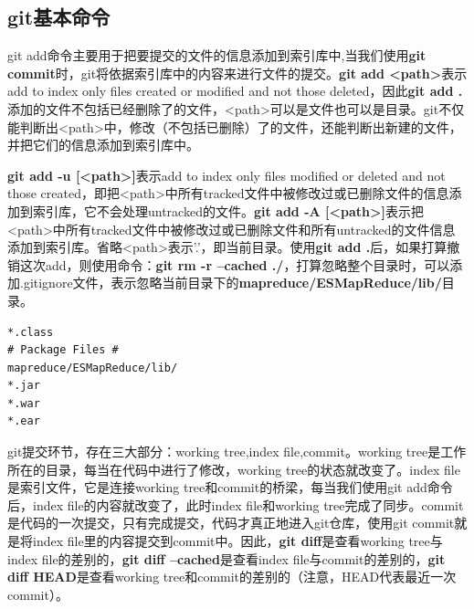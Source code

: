 \subsection{git基本命令}
\par git add命令主要用于把要提交的文件的信息添加到索引库中,当我们使用\textbf{git commit}时，git将依据索引库中的内容来进行文件的提交。\textbf{git add <path>}表示add to index only files created or modified and not those deleted，因此\textbf{git add .}添加的文件不包括已经删除了的文件，<path>可以是文件也可以是目录。git不仅能判断出<path>中，修改（不包括已删除）了的文件，还能判断出新建的文件，并把它们的信息添加到索引库中。
\par \textbf{git add -u [<path>]}表示add to index only files modified or deleted and not those created，即把<path>中所有tracked文件中被修改过或已删除文件的信息添加到索引库，它不会处理untracked的文件。\textbf{git add -A [<path>]}表示把<path>中所有tracked文件中被修改过或已删除文件和所有untracked的文件信息添加到索引库。省略<path>表示'.'，即当前目录。使用\textbf{git add .}后，如果打算撤销这次add，则使用命令：\textbf{git rm -r --cached ./}，打算忽略整个目录时，可以添加.gitignore文件，表示忽略当前目录下的\textbf{mapreduce/ESMapReduce/lib/}目录。
\begin{verbatim}
*.class
# Package Files #
mapreduce/ESMapReduce/lib/
*.jar
*.war
*.ear
\end{verbatim}
\par git提交环节，存在三大部分：working tree,index file,commit。working tree是工作所在的目录，每当在代码中进行了修改，working tree的状态就改变了。index file是索引文件，它是连接working tree和commit的桥梁，每当我们使用git add命令后，index file的内容就改变了，此时index file和working tree完成了同步。commit是代码的一次提交，只有完成提交，代码才真正地进入git仓库，使用git commit就是将index file里的内容提交到commit中。因此，\textbf{git diff}是查看working tree与index file的差别的，\textbf{git diff --cached}是查看index file与commit的差别的，\textbf{git diff HEAD}是查看working tree和commit的差别的（注意，HEAD代表最近一次commit）。
